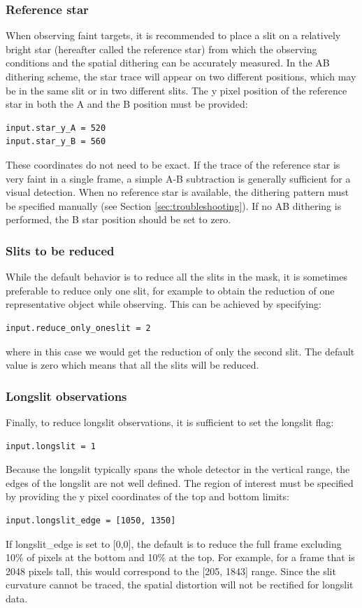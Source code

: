 \documentclass[a4paper, notitlepage]{article}
\begin{document}
\subsubsection{Reference star}
When observing faint targets, it is recommended to place a slit on a relatively bright star (hereafter called the reference star) from which the observing conditions and the spatial dithering can be accurately measured. In the AB dithering scheme, the star trace will appear on two different positions, which may be in the same slit or in two different slits. The y pixel position of the reference star in both the A and the B position must be provided:
\begin{lstlisting}
input.star_y_A = 520
input.star_y_B = 560
\end{lstlisting}
These coordinates do not need to be exact. If the trace of the reference star is very faint in a single frame, a simple A-B subtraction is generally sufficient for a visual detection. When no reference star is available, the dithering pattern must be specified manually (see Section \ref{sec:troubleshooting}). If no AB dithering is performed, the B star position should be set to zero.

\subsubsection{Slits to be reduced}
While the default behavior is to reduce all the slits in the mask, it is sometimes preferable to reduce only one slit, for example to obtain the reduction of one representative object while observing. This can be achieved by specifying:
\begin{lstlisting}
input.reduce_only_oneslit = 2
\end{lstlisting}
where in this case we would get the reduction of only the second slit. The default value is zero which means that all the slits will be reduced.

\subsubsection{Longslit observations}
Finally, to reduce longslit observations, it is sufficient to set the longslit flag:
\begin{lstlisting}
input.longslit = 1
\end{lstlisting}
Because the longslit typically spans the whole detector in the vertical range, the edges of the longslit are not well defined. The region of interest must be specified by providing the y pixel coordinates of the top and bottom limits:
\begin{lstlisting}
input.longslit_edge = [1050, 1350]
\end{lstlisting}
If longslit\_edge is set to [0,0], the default is to reduce the full frame excluding 10\% of pixels at the bottom and 10\% at the top. For example, for a frame that is 2048 pixels tall, this would correspond to the [205, 1843] range. Since the slit curvature cannot be traced, the spatial distortion will not be rectified for longslit data.
\end{document}
